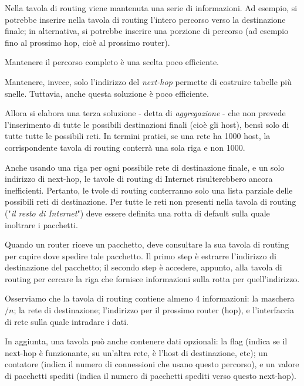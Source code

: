         \vspace{3mm}
        
        Nella tavola di routing viene mantenuta una serie di informazioni. Ad esempio, si potrebbe inserire nella tavola di routing l'intero percorso verso la destinazione finale; in alternativa, si potrebbe inserire una porzione di percorso (ad esempio fino al prossimo hop, cioè al prossimo router).
        
        Mantenere il percorso completo è una scelta poco efficiente.
        
        Mantenere, invece, solo l'indirizzo del \textit{next-hop} permette di costruire tabelle più snelle. Tuttavia, anche questa soluzione è poco efficiente.
        
        Allora si elabora una terza soluzione - detta di \textit{aggregazione} - che non prevede l'inserimento di tutte le possibili destinazioni finali (cioè gli host), bensì solo di tutte tutte le possibili reti. In termini pratici, se una rete ha 1000 host, la corrispondente tavola di routing conterrà una sola riga e non 1000.
        
        \vspace{3mm}
        
        Anche usando una riga per ogni possibile rete di destinazione finale, e un solo indirizzo di next-hop, le tavole di routing di Internet risulterebbero ancora inefficienti. Pertanto, le tvole di routing conterranno solo una lista parziale delle possibili reti di destinazione. Per tutte le reti non presenti nella tavola di routing ("\textit{il resto di Internet}") deve essere definita una rotta di default sulla quale inoltrare i pacchetti.
        
        \vspace{3mm}
        
        Quando un router riceve un pacchetto, deve consultare la sua tavola di routing per capire dove spedire tale pacchetto. Il primo step è estrarre l'indirizzo di destinazione del pacchetto; il secondo step è accedere, appunto, alla tavola di routing per cercare la riga che fornisce informazioni sulla rotta per quell'indirizzo.
        
        Osserviamo che la tavola di routing contiene almeno 4 informazioni: la maschera $/n$; la rete di destinazione; l'indirizzo per il prossimo router (hop), e l'interfaccia di rete sulla quale intradare i dati.
        
        In aggiunta, una tavola può anche contenere dati opzionali: la flag (indica se il next-hop è funzionante, su un'altra rete, è l'host di destinazione, etc); un contatore (indica il numero di connessioni che usano questo percorso), e un valore di pacchetti spediti (indica il numero di pacchetti spediti verso questo next-hop).
        
